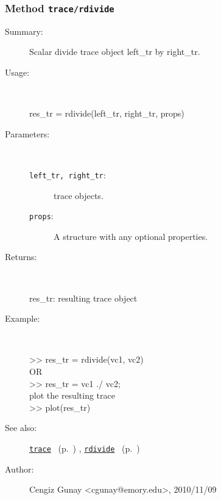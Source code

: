 \subsubsection[Method \texttt{rdivide}]{Method \texttt{trace/rdivide}}%
%
\label{ref_trace__rdivide}%
\hypertarget{ref_trace__rdivide}{}%
\begin{description}
\item[Summary:]Scalar divide trace object left\_tr by right\_tr.
%
\item[Usage:]~%
\begin{lyxcode}%
res\_tr = rdivide(left\_tr, right\_tr, props)
%
\end{lyxcode}%
%
%
\item[Parameters:]~
\begin{description}%
\item[\texttt{left\_tr, right\_tr}:]
 trace objects.
\item[\texttt{props}:]
 A structure with any optional properties.
\end{description}%
%
\item[Returns:
]~

   res\_tr: resulting trace object
%
\item[Example:]~
\begin{lyxcode} >> res\_tr = rdivide(vc1, vc2)
\\%
 OR
\\%
 >> res\_tr = vc1 ./ vc2;
\\%
 plot the resulting trace
\\%
 >> plot(res\_tr)
\\%
\end{lyxcode}
%
\item[See also:]%
\hyperlink{ref_trace}{\texttt{trace}}%
\ (p.~\pageref{ref_trace})%
%
, \hyperlink{ref_rdivide}{\texttt{rdivide}}%
\ (p.~\pageref{ref_rdivide})%
%
%
\item[Author:]%
Cengiz Gunay <cgunay@emory.edu>, 2010/11/09
%
\end{description}
\methodline%
